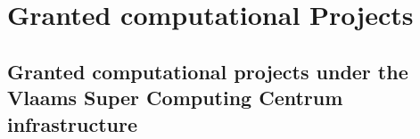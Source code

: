 \renewcommand\evenpagerightmark{{\scshape\small Appendix B}}
\renewcommand\oddpageleftmark{{\scshape\small Granted computational Projects}}



\chapter[Granted computational Projects]{Granted computational Projects}
\label{appb}

\section*{Granted computational projects under the Vlaams Super Computing Centrum infrastructure}

